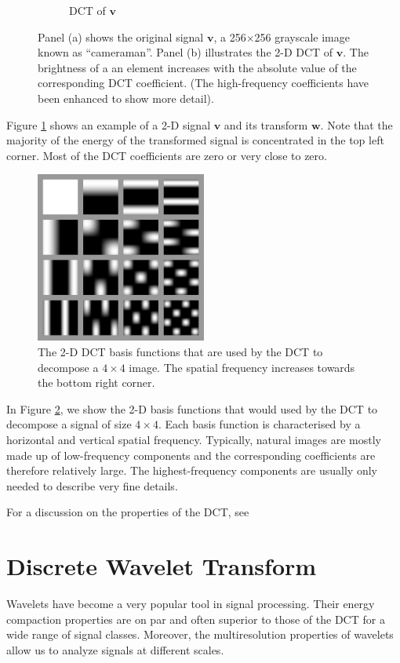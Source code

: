 \begin{figure}
\begin{subfigure}{0.45\textwidth}
    \caption{DCT of $\bm v$}
  \end{subfigure}
  \caption[Two-dimensional DCT applied to a digital image]{Panel (a) shows the original signal $\bm v$, a 256$\times$256 grayscale image known as ``cameraman''. Panel (b) illustrates the 2-D DCT of $\bm v$. The brightness of a an element increases with the absolute value of the corresponding DCT coefficient. (The high-frequency coefficients have been enhanced to show more detail).}
  \label{fig:ch3:dct}
\end{figure}

Figure \ref{fig:ch3:dct} shows an example of a 2-D signal $\bm v$ and its transform $\bm w$.
Note that the majority of the energy of the transformed signal is concentrated in the top left corner.
Most of the DCT coefficients are zero or very close to zero.

\begin{figure}
  \centering
  \includegraphics[width=0.5\textwidth]{Chapter3/Images/dct2functions.png}
  \caption[The 2-D DCT basis functions]{The 2-D DCT basis functions that are used by the DCT to decompose a $4\times 4$ image. 
    The spatial frequency increases towards the bottom right corner.}
  \label{fig:2D-DCT}
\end{figure}

In Figure \ref{fig:2D-DCT}, we show the 2-D basis functions that would used by the DCT to decompose a signal of size $4\times 4$.
Each basis function is characterised by a horizontal and vertical spatial frequency.
Typically, natural images are mostly made up of low-frequency components and the corresponding coefficients are therefore relatively large.
The highest-frequency components are usually only needed to describe very fine details.

For a discussion on the properties of the DCT, see \cite{khayam2003}

\section{Discrete Wavelet Transform}
Wavelets have become a very popular tool in signal processing.
Their energy compaction properties are on par and often superior to those of the DCT for a wide range of signal classes.
Moreover, the multiresolution properties of wavelets allow us to analyze signals at different scales.

